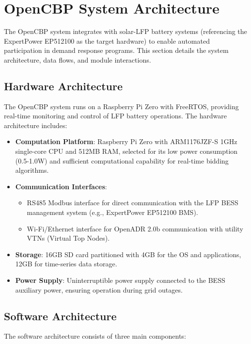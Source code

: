 \documentclass[11pt,a4paper]{article}
\begin{document}
\section{OpenCBP System Architecture}
The OpenCBP system integrates with solar-LFP battery systems (referencing the ExpertPower EP512100 as the target hardware) to enable automated participation in demand response programs. This section details the system architecture, data flows, and module interactions.

\subsection{Hardware Architecture}
The OpenCBP system runs on a Raspberry Pi Zero with FreeRTOS, providing real-time monitoring and control of LFP battery operations. The hardware architecture includes:

\begin{itemize}
    \item \textbf{Computation Platform}: Raspberry Pi Zero with ARM1176JZF-S 1GHz single-core CPU and 512MB RAM, selected for its low power consumption (0.5-1.0W) and sufficient computational capability for real-time bidding algorithms.
    \item \textbf{Communication Interfaces}: 
    \begin{itemize}
        \item RS485 Modbus interface for direct communication with the LFP BESS management system (e.g., ExpertPower EP512100 BMS).
        \item Wi-Fi/Ethernet interface for OpenADR 2.0b communication with utility VTNs (Virtual Top Nodes).
    \end{itemize}
    \item \textbf{Storage}: 16GB SD card partitioned with 4GB for the OS and applications, 12GB for time-series data storage.
    \item \textbf{Power Supply}: Uninterruptible power supply connected to the BESS auxiliary power, ensuring operation during grid outages.
\end{itemize}

\subsection{Software Architecture}
The software architecture consists of three main components:
\end{document}
